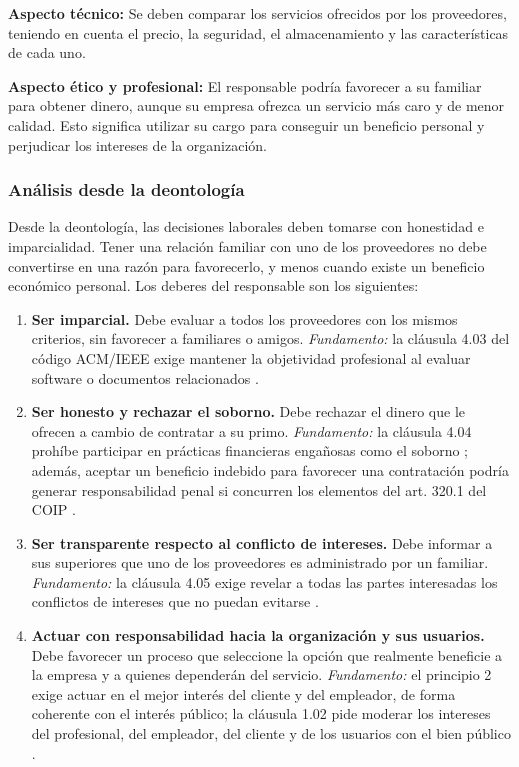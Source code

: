 \documentclass[12pt,a4paper,oneside]{article}
\newcommand{\cita}[1]{\cite{#1}}
\begin{document}
\textbf{Aspecto técnico:} Se deben comparar los servicios ofrecidos por los proveedores, teniendo en cuenta el precio, la seguridad, el almacenamiento y las características de cada uno.

\textbf{Aspecto ético y profesional:} El responsable podría favorecer a su familiar para obtener dinero, aunque su empresa ofrezca un servicio más caro y de menor calidad. Esto significa utilizar su cargo para conseguir un beneficio personal y perjudicar los intereses de la organización.

\subsubsection{Análisis desde la deontología}

Desde la deontología, las decisiones laborales deben tomarse con honestidad e imparcialidad. Tener una relación familiar con uno de los proveedores no debe convertirse en una razón para favorecerlo, y menos cuando existe un beneficio económico personal. Los deberes del responsable son los siguientes:

\begin{enumerate}[leftmargin=1.8em,itemsep=4pt]
    \item \textbf{Ser imparcial.} Debe evaluar a todos los proveedores con los mismos criterios, sin favorecer a familiares o amigos. \emph{Fundamento:} la cláusula 4.03 del código ACM/IEEE exige mantener la objetividad profesional al evaluar software o documentos relacionados \cita{ref:acm}.
    \item \textbf{Ser honesto y rechazar el soborno.} Debe rechazar el dinero que le ofrecen a cambio de contratar a su primo. \emph{Fundamento:} la cláusula 4.04 prohíbe participar en prácticas financieras engañosas como el soborno \cita{ref:acm}; además, aceptar un beneficio indebido para favorecer una contratación podría generar responsabilidad penal si concurren los elementos del art. 320.1 del COIP \cita{ref:coip}.
    \item \textbf{Ser transparente respecto al conflicto de intereses.} Debe informar a sus superiores que uno de los proveedores es administrado por un familiar. \emph{Fundamento:} la cláusula 4.05 exige revelar a todas las partes interesadas los conflictos de intereses que no puedan evitarse \cita{ref:acm}.
    \item \textbf{Actuar con responsabilidad hacia la organización y sus usuarios.} Debe favorecer un proceso que seleccione la opción que realmente beneficie a la empresa y a quienes dependerán del servicio. \emph{Fundamento:} el principio 2 exige actuar en el mejor interés del cliente y del empleador, de forma coherente con el interés público; la cláusula 1.02 pide moderar los intereses del profesional, del empleador, del cliente y de los usuarios con el bien público \cita{ref:acm}.
\end{enumerate}
\end{document}
